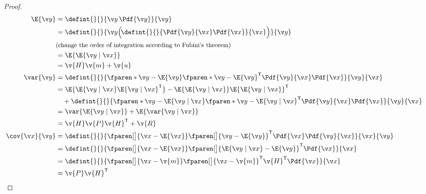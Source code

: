 \begin{proof}
\begin{align}
	\E{\y}&=\defint{}{}{\y\,\Pdf{\y}}{\y} \nonumber\\
	&=\defint{}{}{\y\Big(\!\defint{}{}{\Pdf{\y}{\x}\Pdf{\x}}{\x}\Big)}{\y}\nonumber\\
	&\mbox{{\small (change the order of integration according to Fubini's theorem)}}\nonumber\\
	&=\E{\E{\y\mid\x}}\\
	&=\v{H}\v{m}+\v{u}\\
	\var{\y}&=\defint{}{}{\fparen*{\y-\E{\y}}\fparen*{\y-\E{\y}}^\tr\Pdf{\y}{\x}\Pdf{\x}}{\y}{\x} \nonumber\\
	&=\E{\E{\y\mid\x}\E{\y\mid\x}^\tr}-\E{\E{\y\mid\x}}\E{\E{\y\mid\x}}^\tr \nonumber \\
&\quad+\defint{}{}{\fparen*{\y-\E{\y\mid\x}}\fparen*{\y-\E{\y\mid\x}}^\tr\Pdf{\y}{\x}\Pdf{\x}}{\y}{\x} \nonumber \\
	&= \var{\E{\y\mid\x}}+\E{\var{\y\mid\x}}\\
	&= \v{H}\v{P}\v{H}^\tr+\v{R}\\
	\cov{\x}{\y}&=\defint{}{}{\fparen[\big]{\x-\E{\x}}\fparen[\big]{\y-\E{\y}}^\tr\Pdf{\x}\Pdf{\y}{\x}}{\x}{\y} \nonumber\\
	&=\defint{}{}{\fparen[\big]{\x-\E{\x}}\fparen[\big]{\E{\y\mid\x}-\E{\y}}^\tr\Pdf{\x}}{\x} \nonumber\\
	&=\defint{}{}{\fparen[\big]{\x-\v{m}}\fparen[\big]{\x-\v{m}}^\tr\v{H}^\tr\Pdf{\x}}{\x} \nonumber\\
	&=\v{P}\v{H}^\tr
\end{align}%

\end{proof}
